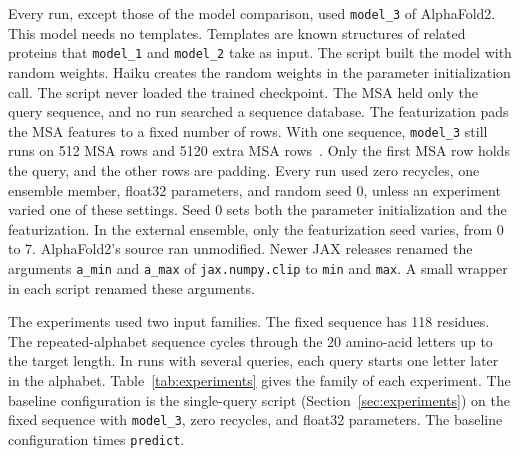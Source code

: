 Every run, except those of the model comparison, used \texttt{model\_3} of AlphaFold2.
This model needs no templates. Templates
are known structures of related proteins that \texttt{model\_1} and \texttt{model\_2} take as input. %
The script built the model with random weights. Haiku creates the random weights in the parameter initialization call.
 The
script never loaded the trained checkpoint. The MSA held only the query sequence, and no run searched a sequence
database. The featurization pads the MSA features to a fixed number of rows.
With one sequence, \texttt{model\_3} still runs on 512 MSA rows and 5120 extra MSA rows~\cite{alphafoldrepo}. %
Only the first MSA row holds the query, and the other rows are padding.
Every run used zero recycles, one ensemble member, float32 parameters, and random seed 0, unless an experiment varied one of these settings. %
Seed 0 sets both the parameter initialization and the featurization. In the external ensemble, only the featurization seed varies, from 0 to 7. %
AlphaFold2's source ran unmodified. Newer JAX releases renamed the arguments \texttt{a\_min} and \texttt{a\_max} of
\texttt{jax.numpy.clip} to \texttt{min} and \texttt{max}. A small wrapper in each script renamed these arguments.

The experiments used two input families. The fixed sequence has 118 residues. %
The repeated-alphabet sequence cycles through the 20 amino-acid letters up to the target length. %
In runs with several queries, each query starts one letter later in the alphabet. Table~\ref{tab:experiments} gives
the family of each experiment. The baseline configuration is the single-query script (Section~\ref{sec:experiments})
on the fixed sequence with \texttt{model\_3}, zero recycles, and float32 parameters.
The baseline configuration times \texttt{predict}.

